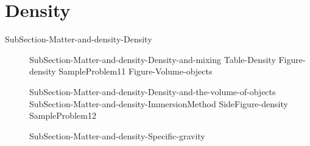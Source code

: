 \documentclass[main.tex]{subfiles}
\newcommand\chapterlabel{Ch-measurements}\setcounter{figurenewcounter}{0}\setcounter{tablenewcounter}{0}\setcounter{formulanewcounter}{0}\chapterpicture{../{\chapterlabel}/figure1}\chapterpicturelabel{PngImg}
\begin{document}
\section{Density}{SubSection-Matter-and-density-Density}
\sloppy\begin{description}
\item[]{SubSection-Matter-and-density-Density-and-mixing}
{Table-Density} 
{Figure-density} 
{SampleProblem11}%
{Figure-Volume-objects}
\item[]{SubSection-Matter-and-density-Density-and-the-volume-of-objects}
{SubSection-Matter-and-density-ImmersionMethod}
{SideFigure-density}
{SampleProblem12}%
\item[]{SubSection-Matter-and-density-Specific-gravity}

 
\end{description}


 \checkoddpage\ifoddpage \clearpage\thispagestyle{empty}\mbox{}\clearpage \else  \fi 
\end{document}
